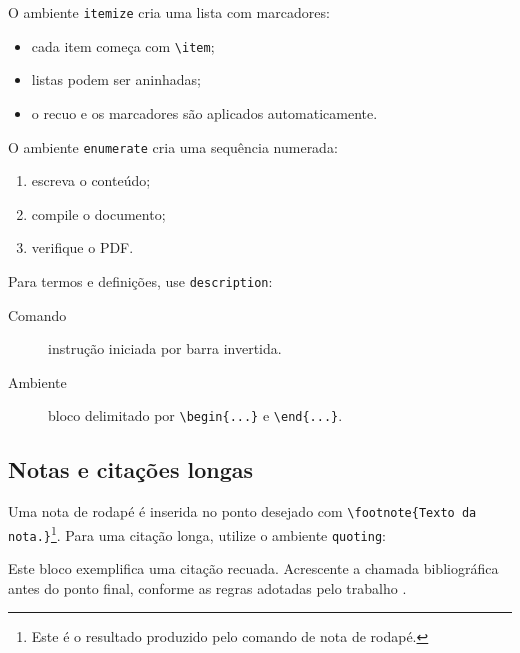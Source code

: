 O ambiente \texttt{itemize} cria uma lista com marcadores:

\begin{itemize}
  \item cada item começa com \lstinline|\item|;
  \item listas podem ser aninhadas;
  \item o recuo e os marcadores são aplicados automaticamente.
\end{itemize}

O ambiente \texttt{enumerate} cria uma sequência numerada:

\begin{enumerate}
  \item escreva o conteúdo;
  \item compile o documento;
  \item verifique o PDF.
\end{enumerate}

Para termos e definições, use \texttt{description}:

\begin{description}
  \item[Comando] instrução iniciada por barra invertida.
  \item[Ambiente] bloco delimitado por \lstinline|\begin{...}| e \lstinline|\end{...}|.
\end{description}

\subsection{Notas e citações longas}

Uma nota de rodapé é inserida no ponto desejado com \lstinline|\footnote{Texto da nota.}|\footnote{Este é o resultado produzido pelo comando de nota de rodapé.}. Para uma citação longa, utilize o ambiente \texttt{quoting}:

\begin{quoting}[leftmargin=4cm]
Este bloco exemplifica uma citação recuada. Acrescente a chamada bibliográfica antes do ponto final, conforme as regras adotadas pelo trabalho \parencite[p.~10]{lamport1994}.
\end{quoting}
